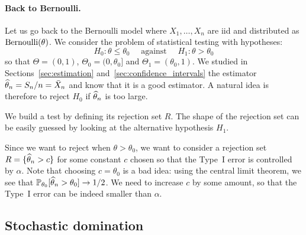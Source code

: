 \paragraph{Back to Bernoulli.} %

Let us go back to the Bernoulli model where $X_1, \ldots, X_n$ are iid and distributed as $\operatorname{Bernoulli}(\theta)$.
We consider the problem of statistical testing with hypotheses:
\begin{equation}
	\label{eq:chap03-tests-hypothesis}
	H_0 : \theta \leq \theta_0 \quad \text{ against } \quad H_1 : \theta > \theta_0
\end{equation}
so that $\Theta = (0, 1)$, $\Theta_0 = (0, \theta_0]$ and $\Theta_1 = (\theta_0, 1)$.
We studied in Sections~\ref{sec:estimation} and~\ref{sec:confidence_intervals} the estimator $\widehat \theta_n = S_n / n = \bar X_n$ and know that it is a good estimator.
A natural idea is therefore to reject $H_0$ if $\widehat \theta_n$ is too large.
\begin{recipe}
	We build a test by defining its rejection set $R$. The shape of the rejection set can be easily guessed by looking at the alternative hypothesis $H_1$.
\end{recipe}
Since we want to reject when $\theta > \theta_0$, we want to consider a rejection set $R = \{ \widehat \theta_n > c \}$ for some constant $c$ chosen so that the Type~I error is controlled by $\alpha$.
Note that choosing $c = \theta_0$ is a bad idea: using the central limit theorem, we see that $\mathbb P_{\theta_0}[\widehat \theta_n > \theta_0] \rightarrow 1/2$.
We need to increase $c$ by some amount, so that the Type~I error can be indeed smaller than $\alpha$.%

\subsection{Stochastic domination} %


